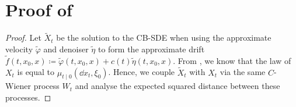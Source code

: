 \section{Proof of }\label{prf:thm:w2}
\restatetheoremw*
\begin{proof}
  Let \(\widetilde{X}_{t}\) be the solution to the CB-SDE when using the approximate velocity \(\widetilde{\varphi}\) and denoiser \(\widetilde{\eta}\) to form the approximate drift \(\widetilde{f}(t, x_{0}, x) \coloneqq \widetilde{\varphi}(t, x_{0}, x) + c(t) \widetilde{\eta}(t, x_{0}, x)\). From , we know that the law of \(X_{t}\) is equal to \(\mu_{t \mid 0}(\dd{x_{t}}, \xi_{0})\). Hence,  we couple \(\widetilde{X}_{t}\) with \(X_{t}\) via the same \(C\)-Wiener process \(W_{t}\) and analyse the expected squared distance between these processes.


\end{proof}
